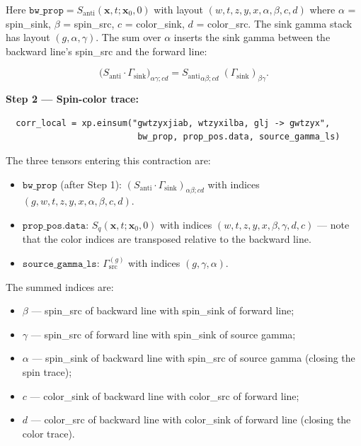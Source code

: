 \documentclass[11pt,a4paper]{article}
\newcommand{\gsrc}{\Gamma_{\text{src}}}
\newcommand{\gsink}{\Gamma_{\text{sink}}}
\newcommand{\Sq}{S_{q}}
\newcommand{\Santi}{S_{\text{anti}}}
\begin{document}
Here \(\texttt{bw\_prop} = \Santi(\mathbf{x}, t; \mathbf{x}_0, 0)\) with layout
\((w, t, z, y, x, \alpha, \beta, c, d)\) where \(\alpha\) = spin\_sink,
\(\beta\) = spin\_src, \(c\) = color\_sink, \(d\) = color\_src.  The sink gamma
stack has layout \((g, \alpha, \gamma)\).  The sum over \(\alpha\) inserts the
sink gamma between the backward line's spin\_src and the forward line:

\begin{equation}
\big(\Santi \cdot \gsink\big)_{\alpha\gamma; cd}
  = {\Santi}_{\alpha\beta; cd} \; (\gsink)_{\beta\gamma} .
\label{eq:sink_insert}
\end{equation}

\textbf{Step 2 --- Spin-color trace:}
\begin{verbatim}
  corr_local = xp.einsum("gwtzyxjiab, wtzyxilba, glj -> gwtzyx",
                          bw_prop, prop_pos.data, source_gamma_ls)
\end{verbatim}

The three tensors entering this contraction are:
\begin{itemize}[nosep]
  \item \(\texttt{bw\_prop}\) (after Step 1): \((\Santi \cdot \gsink)_{\alpha\beta; cd}\)
        with indices \((g, w, t, z, y, x, \alpha, \beta, c, d)\).
  \item \(\texttt{prop\_pos.data}\): \(\Sq(\mathbf{x}, t; \mathbf{x}_0, 0)\)
        with indices \((w, t, z, y, x, \beta, \gamma, d, c)\) --- note that
        the color indices are transposed relative to the backward line.
  \item \(\texttt{source\_gamma\_ls}\): \(\gsrc^{(g)}\) with indices
        \((g, \gamma, \alpha)\).
\end{itemize}

The summed indices are:
\begin{itemize}[nosep]
  \item \(\beta\) --- spin\_src of backward line with spin\_sink of forward line;
  \item \(\gamma\) --- spin\_src of forward line with spin\_sink of source gamma;
  \item \(\alpha\) --- spin\_sink of backward line with spin\_src of source gamma
        (closing the spin trace);
  \item \(c\) --- color\_sink of backward line with color\_src of forward line;
  \item \(d\) --- color\_src of backward line with color\_sink of forward line
        (closing the color trace).
\end{itemize}
\end{document}
